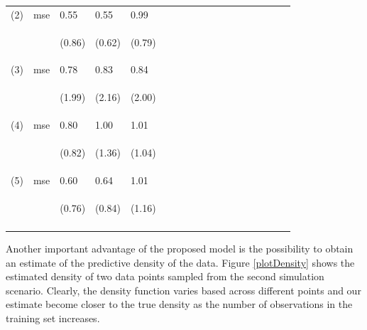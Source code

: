 \documentclass{article}
\begin{document}
\begin{table}[t]
\begin{center}
\begin{small}
\begin{sc}
\begin{tabular}{llllllllllllllllll}
(2)&mse&0.55& 0.55 &0.99\\ 
&& \begin{scriptsize} (0.86)\end{scriptsize} & \begin{scriptsize} (0.62)\end{scriptsize} & \begin{scriptsize} (0.79)\end{scriptsize}\\
(3)&mse&  0.78 &0.83 & 0.84\\
&&   \begin{scriptsize} (1.99)\end{scriptsize} & \begin{scriptsize} (2.16)\end{scriptsize} & \begin{scriptsize} (2.00)\end{scriptsize}\\
(4)&mse& 0.80&1.00&1.01 \\
&& \begin{scriptsize} (0.82)\end{scriptsize}& \begin{scriptsize} (1.36)\end{scriptsize}& \begin{scriptsize} (1.04)\end{scriptsize}\\
(5) &mse & 0.60&0.64 &1.01\\  
&& \begin{scriptsize} (0.76)\end{scriptsize}& \begin{scriptsize} (0.84)\end{scriptsize}& \begin{scriptsize} (1.16)\end{scriptsize}\\
\\
\hline
\end{tabular}
\end{sc}
\end{small}
\end{center}
\vskip -0.1in
\end{table}

Another important advantage of the proposed model is the possibility to obtain an estimate of the predictive density of the data. Figure \ref{plotDensity} shows the estimated density of two data points sampled from the second simulation scenario. Clearly, the density function varies based across different points and our estimate become closer to the true density as the number of observations in the training set increases.
\end{document}
